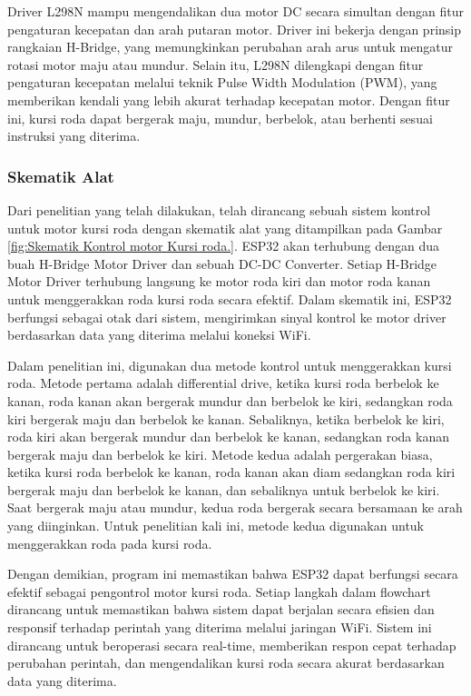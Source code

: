 Driver L298N mampu mengendalikan dua motor DC secara simultan dengan fitur pengaturan kecepatan dan arah putaran motor. Driver ini bekerja dengan prinsip rangkaian H-Bridge, yang memungkinkan perubahan arah arus untuk mengatur rotasi motor maju atau mundur. Selain itu, L298N dilengkapi dengan fitur pengaturan kecepatan melalui teknik Pulse Width Modulation (PWM), yang memberikan kendali yang lebih akurat terhadap kecepatan motor. Dengan fitur ini, kursi roda dapat bergerak maju, mundur, berbelok, atau berhenti sesuai instruksi yang diterima.

\subsubsection{Skematik Alat}
\label{subsubsec:skematikalat}

Dari penelitian yang telah dilakukan, telah dirancang sebuah sistem kontrol untuk motor kursi roda dengan skematik alat yang ditampilkan pada Gambar \ref{fig:Skematik Kontrol motor Kursi roda.}. ESP32 akan terhubung dengan dua buah H-Bridge Motor Driver dan sebuah DC-DC Converter. Setiap H-Bridge Motor Driver terhubung langsung ke motor roda kiri dan motor roda kanan untuk menggerakkan roda kursi roda secara efektif. Dalam skematik ini, ESP32 berfungsi sebagai otak dari sistem, mengirimkan sinyal kontrol ke motor driver berdasarkan data yang diterima melalui koneksi WiFi. \cite{ekatama2024perancangan}

Dalam penelitian ini, digunakan dua metode kontrol untuk menggerakkan kursi roda. Metode pertama adalah differential drive, ketika kursi roda berbelok ke kanan, roda kanan akan bergerak mundur dan berbelok ke kiri, sedangkan roda kiri bergerak maju dan berbelok ke kanan. Sebaliknya, ketika berbelok ke kiri, roda kiri akan bergerak mundur dan berbelok ke kanan, sedangkan roda kanan bergerak maju dan berbelok ke kiri. Metode kedua adalah pergerakan biasa, ketika kursi roda berbelok ke kanan, roda kanan akan diam sedangkan roda kiri bergerak maju dan berbelok ke kanan, dan sebaliknya untuk berbelok ke kiri. Saat bergerak maju atau mundur, kedua roda bergerak secara bersamaan ke arah yang diinginkan. Untuk penelitian kali ini, metode kedua digunakan untuk menggerakkan roda pada kursi roda.

Dengan demikian, program ini memastikan bahwa ESP32 dapat berfungsi secara efektif sebagai pengontrol motor kursi roda. Setiap langkah dalam flowchart dirancang untuk memastikan bahwa sistem dapat berjalan secara efisien dan responsif terhadap perintah yang diterima melalui jaringan WiFi. Sistem ini dirancang untuk beroperasi secara real-time, memberikan respon cepat terhadap perubahan perintah, dan mengendalikan kursi roda secara akurat berdasarkan data yang diterima.

